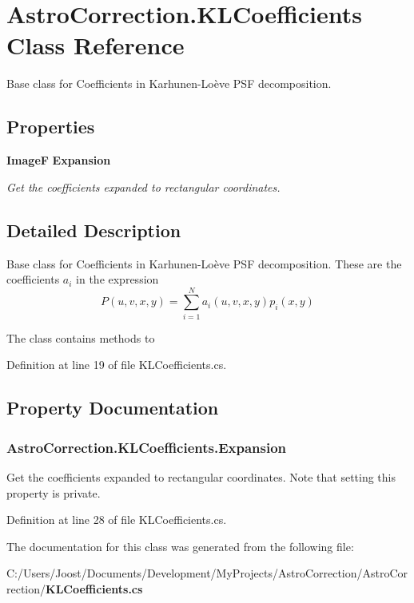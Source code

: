 \section{AstroCorrection.KLCoefficients Class Reference}
\label{class_astro_correction_1_1_k_l_coefficients}


Base class for Coefficients in Karhunen-\/Loève PSF decomposition.  
\subsection*{Properties}
\begin{DoxyCompactItemize}
\item 
{\bf ImageF} {\bf Expansion}\hspace{0.3cm}{\ttfamily  [get, set]}
\begin{DoxyCompactList}\small\item\em Get the coefficients expanded to rectangular coordinates. \item\end{DoxyCompactList}\end{DoxyCompactItemize}


\subsection{Detailed Description}
Base class for Coefficients in Karhunen-\/Loève PSF decomposition. These are the coefficients $a_i$ in the expression \[ P(u, v, x, y) = \sum _ {i = 1} ^ N a_i(u, v, x, y) p_i(x,y) \]

The class contains methods to 

Definition at line 19 of file KLCoefficients.cs.

\subsection{Property Documentation}
\subsubsection[{Expansion}]{ AstroCorrection.KLCoefficients.Expansion\hspace{0.3cm}{\ttfamily  [get, set]}}\label{class_astro_correction_1_1_k_l_coefficients_a1a6d79b74362ab5f842497eef2c66304}


Get the coefficients expanded to rectangular coordinates. Note that setting this property is private. 

Definition at line 28 of file KLCoefficients.cs.

The documentation for this class was generated from the following file:\begin{DoxyCompactItemize}
\item 
C:/Users/Joost/Documents/Development/MyProjects/AstroCorrection/AstroCorrection/{\bf KLCoefficients.cs}\end{DoxyCompactItemize}

